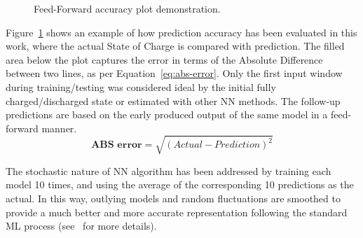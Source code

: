%
%
 {
\begin{figure}[ht]
    \centering
    
    \caption{Feed-Forward accuracy plot demonstration.}
    \label{fig:plot_demo}
\end{figure}
Figure~\ref{fig:plot_demo} shows an example of how prediction accuracy has been evaluated in this work, where the actual State of Charge is compared with prediction.
The filled area below the plot captures the error in terms of the Absolute Difference between two lines, as per Equation~\ref{eq:abs-error}.
Only the first input window during training/testing was considered ideal by the initial fully charged/discharged state or estimated with other NN methods.
The follow-up predictions are based on the early produced output of the same model in a feed-forward manner.
\begin{equation}
    \textbf{ABS error}  = \sqrt{(Actual-Prediction)^2}
    \label{eq:abs-error}
\end{equation}
}
{The stochastic nature of NN algorithm has been addressed by training each model 10 times, and using the average of the corresponding 10 predictions as the actual.
In this way, outlying models and random fluctuations are smoothed to provide a much better and more accurate representation following the standard ML process (see~\cite{sadykov_practical_2022} for more details).}
